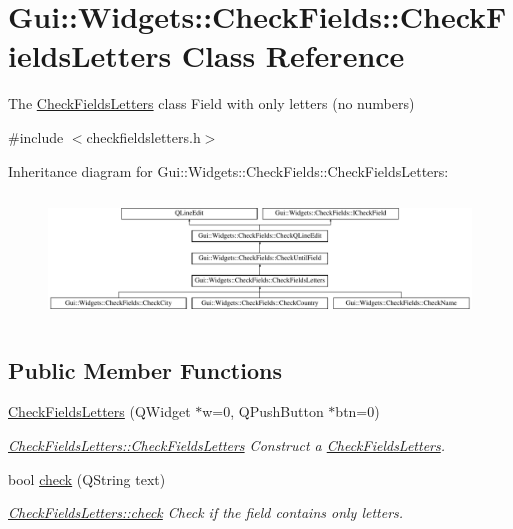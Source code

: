 \hypertarget{classGui_1_1Widgets_1_1CheckFields_1_1CheckFieldsLetters}{}\section{Gui\+:\+:Widgets\+:\+:Check\+Fields\+:\+:Check\+Fields\+Letters Class Reference}
\label{classGui_1_1Widgets_1_1CheckFields_1_1CheckFieldsLetters}


The \hyperlink{classGui_1_1Widgets_1_1CheckFields_1_1CheckFieldsLetters}{Check\+Fields\+Letters} class Field with only letters (no numbers)  




{\ttfamily \#include $<$checkfieldsletters.\+h$>$}

Inheritance diagram for Gui\+:\+:Widgets\+:\+:Check\+Fields\+:\+:Check\+Fields\+Letters\+:\begin{figure}[H]
\begin{center}
\leavevmode
\includegraphics[height=3.345281cm]{df/dba/classGui_1_1Widgets_1_1CheckFields_1_1CheckFieldsLetters}
\end{center}
\end{figure}
\subsection*{Public Member Functions}
\begin{DoxyCompactItemize}
\item 
\hyperlink{classGui_1_1Widgets_1_1CheckFields_1_1CheckFieldsLetters_a2026c54051fdadca10860d0eaaa4b243}{Check\+Fields\+Letters} (Q\+Widget $\ast$w=0, Q\+Push\+Button $\ast$btn=0)
\begin{DoxyCompactList}\small\item\em \hyperlink{classGui_1_1Widgets_1_1CheckFields_1_1CheckFieldsLetters_a2026c54051fdadca10860d0eaaa4b243}{Check\+Fields\+Letters\+::\+Check\+Fields\+Letters} Construct a \hyperlink{classGui_1_1Widgets_1_1CheckFields_1_1CheckFieldsLetters}{Check\+Fields\+Letters}. \end{DoxyCompactList}\item 
bool \hyperlink{classGui_1_1Widgets_1_1CheckFields_1_1CheckFieldsLetters_a95f6808ecc2cedf22407fc1791827851}{check} (Q\+String text)
\begin{DoxyCompactList}\small\item\em \hyperlink{classGui_1_1Widgets_1_1CheckFields_1_1CheckFieldsLetters_a95f6808ecc2cedf22407fc1791827851}{Check\+Fields\+Letters\+::check} Check if the field contains only letters. \end{DoxyCompactList}\end{DoxyCompactItemize}

